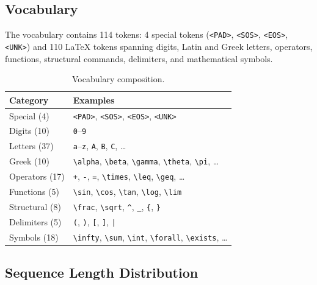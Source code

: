\documentclass[11pt,a4paper]{article}
\begin{document}
\subsection{Vocabulary}

The vocabulary contains 114 tokens: 4 special tokens (\texttt{<PAD>}, \texttt{<SOS>}, \texttt{<EOS>}, \texttt{<UNK>}) and 110 \LaTeX{} tokens spanning digits, Latin and Greek letters, operators, functions, structural commands, delimiters, and mathematical symbols.

\begin{table}[H]
\centering
\caption{Vocabulary composition.}
\label{tab:vocab}
\begin{tabular}{ll}
\toprule
\textbf{Category} & \textbf{Examples} \\
\midrule
Special (4)    & \texttt{<PAD>}, \texttt{<SOS>}, \texttt{<EOS>}, \texttt{<UNK>} \\
Digits (10)    & \texttt{0}--\texttt{9} \\
Letters (37)   & \texttt{a}--\texttt{z}, \texttt{A}, \texttt{B}, \texttt{C}, \ldots \\
Greek (10)     & \texttt{\textbackslash alpha}, \texttt{\textbackslash beta}, \texttt{\textbackslash gamma}, \texttt{\textbackslash theta}, \texttt{\textbackslash pi}, \ldots \\
Operators (17) & \texttt{+}, \texttt{-}, \texttt{=}, \texttt{\textbackslash times}, \texttt{\textbackslash leq}, \texttt{\textbackslash geq}, \ldots \\
Functions (5)  & \texttt{\textbackslash sin}, \texttt{\textbackslash cos}, \texttt{\textbackslash tan}, \texttt{\textbackslash log}, \texttt{\textbackslash lim} \\
Structural (8) & \texttt{\textbackslash frac}, \texttt{\textbackslash sqrt}, \texttt{\^{}}, \texttt{\_}, \texttt{\{}, \texttt{\}} \\
Delimiters (5) & \texttt{(}, \texttt{)}, \texttt{[}, \texttt{]}, \texttt{|} \\
Symbols (18)   & \texttt{\textbackslash infty}, \texttt{\textbackslash sum}, \texttt{\textbackslash int}, \texttt{\textbackslash forall}, \texttt{\textbackslash exists}, \ldots \\
\bottomrule
\end{tabular}
\end{table}

\subsection{Sequence Length Distribution}
\end{document}
